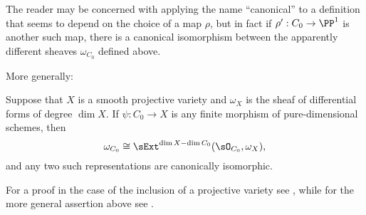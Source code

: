 The reader may be concerned with applying the name ``canonical'' to a definition that seems to
depend on the choice of a map $\rho$, but in fact if $\rho': C_0 \to \PP^1$ is another such map,
there is a canonical isomorphism between the apparently different sheaves $\omega_{C_0}$ defined above.

More generally:

\begin{fact}
Suppose that $X$ is a smooth projective variety and $\omega_X$ is the sheaf of differential forms of degree $\dim X$.
If $\psi: C_0 \to X$ is any finite morphism of pure-dimensional schemes, then
$$
\omega_{C_0} \cong \sExt^{\dim X -\dim C_0}(\sO_{C_0}, \omega_X),
$$
and any two such representations are canonically isomorphic.
\end{fact}

For a proof in the case of the inclusion of a projective variety see \cite[Section III.7]{Hartshorne1977}, while for the more general assertion above see \cite{AltmanKleiman}. 


